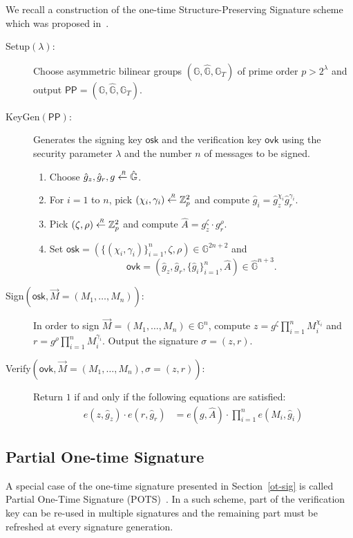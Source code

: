 \documentclass[10pt]{llncs}
\newcommand{\G}{\mathbb{G}}
\newcommand{\ovk}{\mathsf{ovk}}
\newcommand{\osk}{\mathsf{osk}}
\newcommand{\True}{\mathsf{True}}
\newcommand{\sample}{\stackrel{{\scriptscriptstyle \mkern4mu R}}{\gets}}
\newcommand{\PPP}{\mathsf{PP}}
\begin{document}
We recall a construction of the one-time Structure-Preserving Signature scheme which was proposed in~\cite{DBLP:conf/pkc/AbeDKNO13}.


\begin{description}
\item[\textsf{Setup}$(\lambda):$]  Choose asymmetric bilinear groups $(\G, \hat{\G}, \G_T)$ of prime order $p>2^\lambda $ and output 
$\PPP =(\G, \hat{\G}, \G_T)$.
\item[\textsf{KeyGen}$(\PPP):$]   Generates the signing key $\osk$ and the verification key $\ovk$ using the security parameter $\lambda$ and  the number $n$ of messages to be signed.
  \begin{enumerate}
  \item Choose $\hat{g}_z, \hat{g}_r, g \sample \hat{\G}$.
  \item For $i = 1$ to $n$, pick $(\chi_i, \gamma_i) \sample \mathbb{Z}_p^2$
    and compute $\hat g_i=\hat{g}_z^{\chi_i}\hat{g}_r^{\gamma_i}$.
  \item Pick $(\zeta, \rho) \sample \mathbb{Z}_p^2$ and compute $\hat{A} = g_z^{\zeta} \cdot g_r^{\rho}$.
  \item Set $\osk = (\{(\chi_i, \gamma_i)\}_{i = 1}^n, \zeta, \rho) \in \G^{2n+2}$ and 
	$$\ovk = (\hat{g}_z, \hat{g}_r, \{\hat{g}_i\}_{i=1}^n, \hat{A}) \in \hat{\G}^{n+3}.$$
  \end{enumerate}
\item[\textsf{Sign}$(\osk, \vec{M} = (M_1, \dots, M_n)):$] In order to sign   $\vec{M} = (M_1, \dots, M_n) \in \G^n$, 
    compute $z = g^{\zeta}\prod_{i = 1}^n M_i^{\chi_i}$ and $r = g^{\rho}\prod_{i=1}^n M_i^{\gamma_i}$.
Output the signature $\sigma = (z,r)$.
\item[\textsf{Verify}$(\ovk, \vec{M} = (M_1, \dots, M_n), \sigma = (z, r)):$] Return $1$ if and only if the following equations are satisfied:
  \begin{align}\label{OT-validity}
    e(z, \hat{g}_z) \cdot e(r, \hat{g}_r) &= e(g, \hat{A}) \cdot \prod_{i=1}^ne(M_i, \hat{g}_i)
  \end{align}
\end{description}

	
\subsection{Partial  One-time Signature}\label{pots}    
A special case of the one-time signature presented in   Section~\ref{ot-sig} 
is called Partial One-Time Signature (POTS)~\cite{DBLP:conf/pkc/BellareS07}.
In a such scheme,  part of the verification key can be re-used in multiple signatures  and 
 the remaining part  must be refreshed at  every  signature generation.
\end{document}
